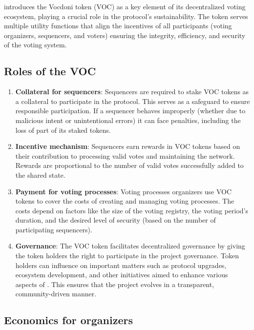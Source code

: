 

\Davinci introduces the Vocdoni token (VOC) as a key element of its decentralized voting ecosystem, playing a crucial role in the protocol's sustainability.
The token serves multiple utility functions that align the incentives of all participants (voting organizers, sequencers, and voters) ensuring the integrity, efficiency, and security of the voting system.

\subsection{Roles of the VOC}

\begin{enumerate}
	\item \textbf{Collateral for sequencers}: Sequencers are required to stake VOC tokens as a collateral to participate in the protocol. This serves as a safeguard to ensure responsible participation. If a sequencer behaves improperly (whether due to malicious intent or unintentional errors) it can face penalties, including the loss of part of its staked tokens.
	\item \textbf{Incentive mechanism}: Sequencers earn rewards in VOC tokens based on their contribution to processing valid votes and maintaining the network. Rewards are proportional to the number of valid votes successfully added to the shared state.
	\item \textbf{Payment for voting processes}: Voting processes organizers use VOC tokens to cover the costs of creating and managing voting processes. The costs depend on factors like the size of the voting registry, the voting period's duration, and the desired level of security (based on the number of participating sequencers).
	\item \textbf{Governance}: The VOC token facilitates decentralized governance by giving the token holders the right to participate in the project governance. Token holders can influence on important matters such as protocol upgrades, ecosystem development, and other initiatives aimed to enhance various aspects of \davinci. This ensures that the project evolves in a transparent, community-driven manner.
\end{enumerate}

\subsection{Economics for organizers}

